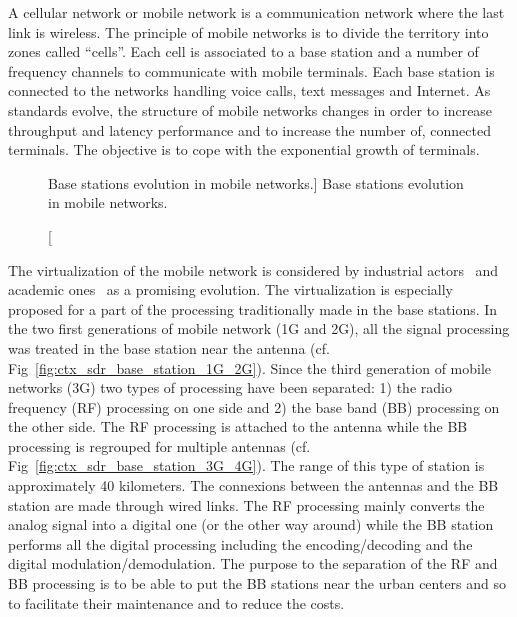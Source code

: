 
A cellular network or mobile network is a communication network where the last
link is wireless. The principle of mobile networks is to divide the territory
into zones called ``cells''. Each cell is associated to a base station and a
number of frequency channels to communicate with mobile terminals. Each base
station is connected to the networks handling voice calls, text messages and
Internet. As standards evolve, the structure of mobile networks changes in order
to increase throughput and latency performance and to increase the number of,
connected terminals. The objective is to cope with the exponential growth of
terminals.


\begin{figure}[htp]
  \centering
  \quad{}
  \quad{}
  \caption
    [Base stations evolution in mobile networks.]
    {Base stations evolution in mobile networks.}
  \label{fig:ctx_sdr_base_station}
\end{figure}


The virtualization of the mobile network is considered by industrial
actors~\cite{Huawei2013,Ericsson2015} and academic ones~\cite{Wubben2014,
Rost2014,Checko2015a} as a promising evolution. The virtualization is especially
proposed for a part of the processing traditionally made in the base stations.
In the two first generations of mobile network (1G and 2G), all the signal
processing was treated in the base station near the antenna (cf.
Fig~\ref{fig:ctx_sdr_base_station_1G_2G}). Since the third generation of mobile
networks (3G) two types of processing have been separated: 1) the radio
frequency (RF) processing on one side and 2) the base band (BB) processing on
the other side. The RF processing is attached to the antenna while the BB
processing is regrouped for multiple antennas (cf.
Fig~\ref{fig:ctx_sdr_base_station_3G_4G}). The range of this type of station is
approximately 40 kilometers. The connexions between the antennas and the BB
station are made through wired links. The RF processing mainly converts the
analog signal into a digital one (or the other way around) while the BB station
performs all the digital processing including the encoding/decoding and the
digital modulation/demodulation. The purpose to the separation of the RF and BB
processing is to be able to put the BB stations near the urban centers and so to
facilitate their maintenance and to reduce the costs.

